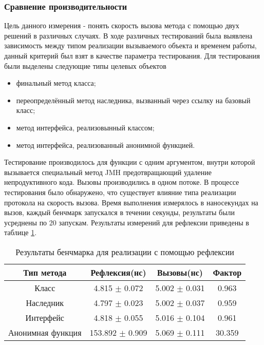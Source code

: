 \subsubsection{Сравнение производительности}
Цель данного измерения - понять скорость вызова метода с помощью двух решений в различных случаях. В ходе различных тестирований была выявлена зависимость между типом реализации вызываемого объекта и временем работы, данный критерий был взят в качестве параметра тестирования. Для тестирования были выделены следующие типы целевых объектов
\begin{itemize}
  \item финальный метод класса;
  \item переопределённый метод наследника, вызванный через ссылку на базовый класс;
  \item метод интерфейса, реализовынный классом;
  \item метод интерфейса, реализованный анонимной функцией.
\end{itemize}

Тестирование производилось для функции с одним аргументом, внутри которой вызывается специальный метод JMH предотвращающий удаление непродуктивного кода. Вызовы производились в одном потоке. В процессе тестирования было обнаружено, что существует влияние типа реализации протокола на скорость вызова. Время выполнения измерялось в наносекундах на вызов, каждый бенчмарк запускался в течении секунды, результаты были усреднены по 20 запускам. Результаты измерений для рефлексии приведены в таблице \ref{benchmark:prototype}.
\begin{table}
\begin{center}
\begin{tabular}{|c|c|c|c|} \hline
Тип метода & Рефлексия(нс) &  Вызовы(нс) & Фактор \\ \hline
Класс & 4.815 $\pm$ 0.072 & 5.002 $\pm$ 0.031 & 0.963 \\ \hline
Наследник & 4.797 $\pm$ 0.023 & 5.002 $\pm$ 0.037 & 0.959 \\ \hline
Интерфейс & 4.818 $\pm$ 0.055 & 5.016 $\pm$ 0.104 & 0.961 \\ \hline
Анонимная функция & 153.892 $\pm$ 0.909 & 5.069 $\pm$ 0.111 & 30.359 \\ \hline
\end{tabular}
\caption{Результаты бенчмарка для реализации с помощью рефлексии}
\label{benchmark:prototype}
\end{center}
\end{table}


